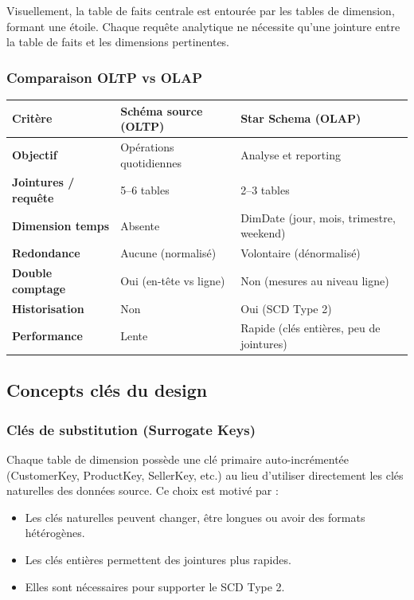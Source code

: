 \documentclass[11pt,a4paper]{article}
\renewcommand{\texttt}[1]{{\ttfamily\small\colorbox{codebg}{\textcolor{darktext}{#1}}}}
\newcommand{\tableheadcolor}{\rowcolor{primary}}
\newcommand{\tableheadfont}{\color{white}\bfseries}
\begin{document}
Visuellement, la table de faits centrale est entourée par les tables de dimension, formant une étoile. Chaque requête analytique ne nécessite qu'une jointure entre la table de faits et les dimensions pertinentes.

\subsubsection{Comparaison OLTP vs OLAP}

\begin{center}
\small
\begin{tabularx}{\textwidth}{>{\bfseries}p{4cm} X X}
\toprule
\tableheadcolor
\tableheadfont Critère & \tableheadfont Schéma source (OLTP) & \tableheadfont Star Schema (OLAP) \\
\midrule
Objectif & Opérations quotidiennes & Analyse et reporting \\
\rowcolor{lightbg}
Jointures / requête & 5--6 tables & 2--3 tables \\
Dimension temps & Absente & DimDate (jour, mois, trimestre, weekend) \\
\rowcolor{lightbg}
Redondance & Aucune (normalisé) & Volontaire (dénormalisé) \\
Double comptage & Oui (en-tête vs ligne) & Non (mesures au niveau ligne) \\
\rowcolor{lightbg}
Historisation & Non & Oui (SCD Type 2) \\
Performance & Lente & Rapide (clés entières, peu de jointures) \\
\bottomrule
\end{tabularx}
\end{center}

\subsection{Concepts clés du design}

\subsubsection{Clés de substitution (Surrogate Keys)}

Chaque table de dimension possède une clé primaire auto-incrémentée (\texttt{CustomerKey}, \texttt{ProductKey}, \texttt{SellerKey}, etc.) au lieu d'utiliser directement les clés naturelles des données source. Ce choix est motivé par :
\begin{itemize}[noitemsep,leftmargin=1.2em]
  \item Les clés naturelles peuvent changer, être longues ou avoir des formats hétérogènes.
  \item Les clés entières permettent des jointures plus rapides.
  \item Elles sont nécessaires pour supporter le SCD Type 2.
\end{itemize}
\end{document}
